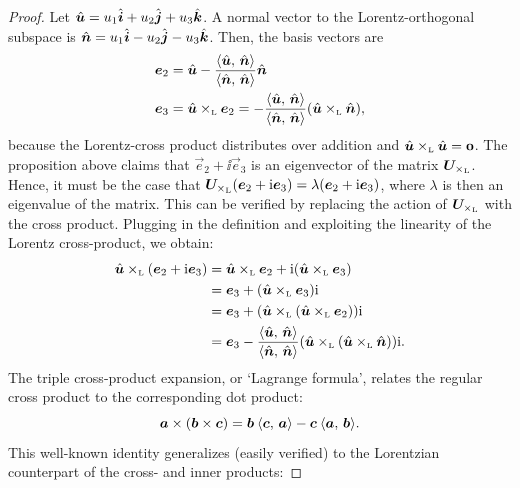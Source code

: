 \begin{proof}
    Let $\uvec{u} = u_1\uvec{i} + u_2\uvec{j} + u_3\uvec{k}$. A normal vector to the Lorentz-orthogonal subspace is $
    \uvec{n} = u_1\uvec{i} - u_2\uvec{j} - u_3\uvec{k}$. Then, the basis vectors are
    \begin{equation}
        \begin{split}
            \vec{e}_2 &= 
            \uvec{u} - \frac{ \inner{\uvec{u}}{\uvec{n}} }{ \inner{\uvec{n}}{\uvec{n}} } \uvec{n} \\
            \vec{e}_3 &= \lorcrossp{\uvec{u}}{\vec{e}_2} = -\frac{ \inner{\uvec{u}}{\uvec{n}} }{ \inner{\uvec{n}}{\uvec{n}} } \qty(\lorcrossp{\uvec{u}}{\uvec{n}}),
        \end{split}
    \end{equation}
    because the Lorentz-cross product distributes over addition and $\lorcrossp{\uvec{u}}{\uvec{u}} = \vec{0}$. The proposition above claims that $\vec{e}_2 + \ii\vec{e}_3$ is an eigenvector of the matrix $\mat{U}_{\lorcrossp{}{}}$. Hence, it must be the case that $\mat{U}_{\lorcrossp{}{}}(\vec{e}_2 + \ii\vec{e}_3) = \lambda(\vec{e}_2 + \ii\vec{e}_3)$, where $\lambda$ is then an eigenvalue of the matrix. This can be verified by replacing the action of $\mat{U}_{\lorcrossp{}{}}$ with the cross product. Plugging in the definition and exploiting the linearity of the Lorentz cross-product, we obtain:
    \begin{equation*}
        \begin{split}
            \lorcrossp{\uvec{u}}{\qty(\vec{e}_2 + \ii\vec{e}_3)} 
            &= \lorcrossp{\uvec{u}}{\vec{e}_2} +
        \ii\qty(\lorcrossp{\uvec{u}}{\vec{e}_3}) \\
            &= \vec{e}_3 + \qty(\lorcrossp{\uvec{u}}{\vec{e}_3})\ii \\ 
            &=\vec{e}_3 +  \qty(\lorcrossp{\uvec{u}}{\qty(\lorcrossp{\uvec{u}}{\vec{e}_2})})\ii \\
            &=\vec{e}_3 -  \frac{ \inner{\uvec{u}}{\uvec{n}} }{ \inner{\uvec{n}}{\uvec{n}} }\qty(\lorcrossp{\uvec{u}}{\qty(\lorcrossp{\uvec{u}}{\uvec{n}})})\ii.  \\
        \end{split}
    \end{equation*}
The triple cross-product expansion, or `Lagrange formula', relates the regular cross product to the corresponding dot product:
    $$ \vec{a}\times\qty(\vec{b}\times\vec{c}) = \vec{b}\:\inner{\vec{c}}{\vec{a}} - \vec{c}\:\inner{\vec{a}}{\vec{b}}. $$
This well-known identity generalizes (easily verified) to the Lorentzian counterpart of the cross- and inner products:

\end{proof}
